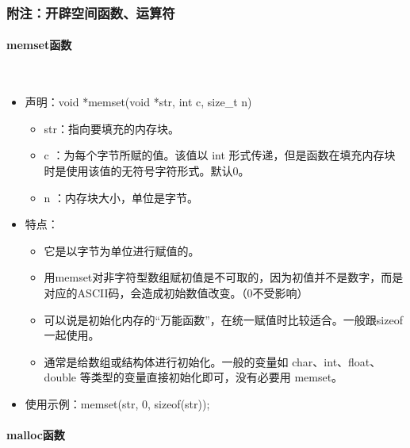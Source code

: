 \documentclass[UTF8]{article}%
\begin{document}
\subsubsection{附注：开辟空间函数、运算符}

\paragraph{memset函数}~{}

\begin{itemize}
    \item 声明：void *memset(void *str, int c, size\_t n)
    {
    \begin{itemize}
        \item str：指向要填充的内存块。
        \item c ：为每个字节所赋的值。该值以 int 形式传递，但是函数在填充内存块时是使用该值的无符号字符形式。默认0。
        \item n ：内存块大小，单位是字节。
    \end{itemize}
    }
    \item 特点：
    {
    \begin{itemize}
        \item 它是以字节为单位进行赋值的。
        \item 用memset对非字符型数组赋初值是不可取的，因为初值并不是数字，而是对应的ASCII码，会造成初始数值改变。（0不受影响）
        \item 可以说是初始化内存的“万能函数”，在统一赋值时比较适合。一般跟sizeof一起使用。
        \item 通常是给数组或结构体进行初始化。一般的变量如 char、int、float、double 等类型的变量直接初始化即可，没有必要用 memset。
    \end{itemize}
    }
    \item 使用示例：memset(str, 0, sizeof(str));
\end{itemize}

\paragraph{malloc函数}~{}
\end{document}
